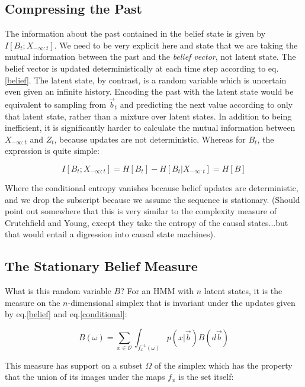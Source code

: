 \documentclass{article} %
\begin{document}
\subsection{Compressing the Past}

The information about the past contained in the belief state is given by $I[B_t;X_{-\infty:t}]$.  We need to be very explicit here and state that we are taking the mutual information between the past and the {\em belief vector}, not latent state.  The belief vector is updated deterministically at each time step according to eq.\ref{belief}.  The latent state, by contrast, is a random variable which is uncertain even given an infinite history.  Encoding the past with the latent state would be equivalent to sampling from $\vec{b}_t$ and predicting the next value according to only that latent state, rather than a mixture over latent states.  In addition to being inefficient, it is significantly harder to calculate the mutual information between $X_{-\infty:t}$ and $Z_t$, because updates are not deterministic.  Whereas for $B_t$, the expression is quite simple:

\begin{equation}
I[B_t;X_{-\infty:t}] = H[B_t] - H[B_t|X_{-\infty:t}] = H[B]
\end{equation}

Where the conditional entropy vanishes because belief updates are deterministic, and we drop the subscript because we assume the sequence is stationary.  (Should point out somewhere that this is very similar to the complexity measure of Crutchfield and Young, except they take the entropy of the causal states...but that would entail a digression into causal state machines).  

\subsection{The Stationary Belief Measure}

What is this random variable $B$?  For an HMM with $n$ latent states, it is the measure on the $n$-dimensional simplex that is invariant under the updates given by eq.\ref{belief} and eq.\ref{conditional}:

\begin{equation}
B(\omega) = \sum_{x\in\mathcal{O}} \int_{f_x^{-1}(\omega)} p(x|\vec{b}) B(d\vec{b})
\end{equation}

This measure has support on a subset $\Omega$ of the simplex which has the property that the union of its images under the maps $f_x$ is the set itself:
\end{document}
